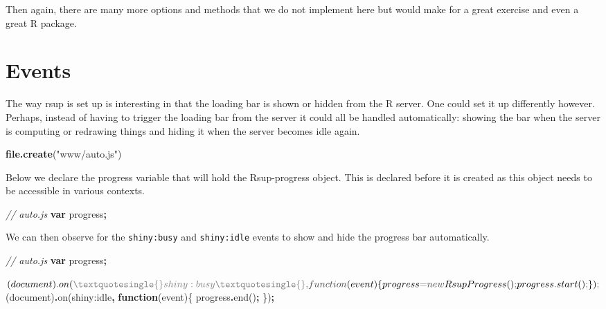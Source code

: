 \documentclass[
]{krantz}
\makeatletter
\newenvironment{Shaded}{\begin{snugshade}}{\end{snugshade}}
\newcommand{\BuiltInTok}[1]{#1}
\newcommand{\CommentTok}[1]{\textcolor[rgb]{0.37,0.37,0.37}{\textit{#1}}}
\newcommand{\FunctionTok}[1]{\textcolor[rgb]{0,0,0}{#1}}
\newcommand{\KeywordTok}[1]{\textcolor[rgb]{0.27,0.27,0.27}{\textbf{#1}}}
\newcommand{\NormalTok}[1]{#1}
\newcommand{\OperatorTok}[1]{\textcolor[rgb]{0.43,0.43,0.43}{\textbf{#1}}}
\newcommand{\StringTok}[1]{\textcolor[rgb]{0.5,0.5,0.5}{#1}}
\newenvironment{kframe}{%
\medskip{}
\setlength{\fboxsep}{.8em}
 \def\at@end@of@kframe{}%
 \ifinner\ifhmode%
  \def\at@end@of@kframe{\end{minipage}}%
  \begin{minipage}{\columnwidth}%
 \fi\fi%
 \def\FrameCommand##1{\hskip\@totalleftmargin \hskip-\fboxsep
 \colorbox{shadecolor}{##1}\hskip-\fboxsep
     \hskip-\linewidth \hskip-\@totalleftmargin \hskip\columnwidth}%
 \MakeFramed {\advance\hsize-\width
   \@totalleftmargin\z@ \linewidth\hsize
   \@setminipage}}%
 {\par\unskip\endMakeFramed%
 \at@end@of@kframe}
\renewenvironment{Shaded}{\begin{kframe}}{\end{kframe}}
\makeatother
\begin{document}
Then again, there are many more options and methods that we do not implement here but would make for a great exercise and even a great R package.

\hypertarget{progress-events}{%
\section{Events}\label{progress-events}}

The way rsup is set up is interesting in that the loading bar is shown or hidden from the R server. One could set it up differently however. Perhaps, instead of having to trigger the loading bar from the server it could all be handled automatically: showing the bar when the server is computing or redrawing things and hiding it when the server becomes idle again.

\begin{Shaded}
\begin{Highlighting}[]
\KeywordTok{file.create}\NormalTok{(}\StringTok{"www/auto.js"}\NormalTok{)}
\end{Highlighting}
\end{Shaded}

Below we declare the progress variable that will hold the Rsup-progress object. This is declared before it is created as this object needs to be accessible in various contexts.

\begin{Shaded}
\begin{Highlighting}[]
\CommentTok{// auto.js}
\KeywordTok{var}\NormalTok{ progress}\OperatorTok{;}
\end{Highlighting}
\end{Shaded}

We can then observe for the \texttt{shiny:busy} and \texttt{shiny:idle} events to show and hide the progress bar automatically.

\begin{Shaded}
\begin{Highlighting}[]
\CommentTok{// auto.js}
\KeywordTok{var}\NormalTok{ progress}\OperatorTok{;}

\NormalTok{$(}\BuiltInTok{document}\NormalTok{)}\OperatorTok{.}\FunctionTok{on}\NormalTok{(}\StringTok{\textquotesingle{}shiny:busy\textquotesingle{}}\OperatorTok{,} \KeywordTok{function}\NormalTok{(}\BuiltInTok{event}\NormalTok{)\{}
\NormalTok{  progress }\OperatorTok{=} \KeywordTok{new}\NormalTok{ RsupProgress()}\OperatorTok{;}
\NormalTok{  progress}\OperatorTok{.}\FunctionTok{start}\NormalTok{()}\OperatorTok{;}
\NormalTok{\})}\OperatorTok{;}

\NormalTok{$(}\BuiltInTok{document}\NormalTok{)}\OperatorTok{.}\FunctionTok{on}\NormalTok{(}\StringTok{\textquotesingle{}shiny:idle\textquotesingle{}}\OperatorTok{,} \KeywordTok{function}\NormalTok{(}\BuiltInTok{event}\NormalTok{)\{}
\NormalTok{  progress}\OperatorTok{.}\FunctionTok{end}\NormalTok{()}\OperatorTok{;}
\NormalTok{\})}\OperatorTok{;}
\end{Highlighting}
\end{Shaded}
\end{document}
